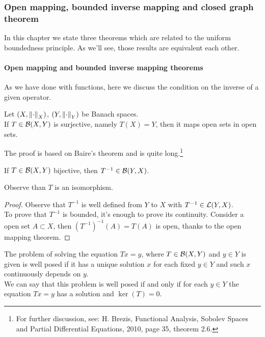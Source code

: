 \subsubsection{Open mapping, bounded inverse mapping and closed graph theorem}
In this chapter we state three theorems which are related to the uniform boundedness principle. As we'll see, those results are equivalent each other.


\paragraph{Open mapping and bounded inverse mapping theorems} As we have done with functions, here we discuss the condition on the inverse of a given operator.

\begin{theo}
	Let $(X, \left\lVert\cdot\right\rVert_X)$, $(Y, \left\lVert\cdot\right\rVert_Y)$ be Banach spaces. \\
	If $T \in \mathcal B (X,Y)$ is surjective, namely $T(X) = Y$, then it maps open sets in open sets.
\end{theo}

The proof is based on Baire's theorem and is quite long.\footnote{For further discussion, see: H. Brezis, Functional Analysis, Sobolev Spaces and Partial Differential Equations, 2010, page 35, theorem 2.6.}

\medskip
\begin{theo}\label{bounded-inverse-theo}
	If $T\in \mathcal B(X,Y)$ bijective, then $T^{-1} \in \mathcal B(Y,X)$.
\end{theo}
Observe than $T$ is an isomorphism.

\begin{proof}
	Observe that $T^{-1}$ is well defined from $Y$ to $X$ with $T^{-1} \in \mathcal L(Y,X)$.\\
	To prove that $T^{-1}$ is bounded, it's enough to prove its continuity. Consider a open set $A\subset X$, then $(T^{-1})^{-1}(A) = T(A)$ is open, thanks to the open mapping theorem.
\end{proof}

The problem of solving the equation $Tx=y$, where $T \in \mathcal B(X,Y)$ and $y \in Y$ is given is well posed if it has a unique solution $x$ for each fixed $y \in Y$ and such $x$ continuously depends on $y$.\\
We can say that this problem is well posed if and only if for each $y \in Y$ the equation $Tx = y$ has a solution and $\ker(T)=0$.


